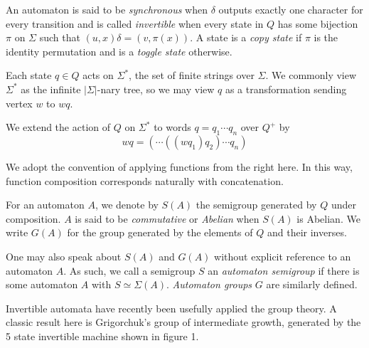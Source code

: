 \documentclass[10pt]{article} %
\newcommand{\defn}[1]{\textit{#1}}
\begin{document}
    An automaton is said to be \defn{synchronous} when $\delta$ outputs exactly one character for every transition and is called \defn{invertible} when every state in $Q$ has some bijection $\pi$ on $\Sigma$ such that $(u, x)\delta = (v, \pi(x))$. A state is a \defn{copy state} if $\pi$ is the identity permutation and is a \defn{toggle state} otherwise.

    Each state $q \in Q$ acts on $\Sigma^*$, the set of finite strings over $\Sigma$. We commonly view $\Sigma^*$ as the infinite $|\Sigma|$-nary tree, so we may view $q$ as a transformation sending vertex $w$ to $wq$.

    We extend the action of $Q$ on $\Sigma^*$ to words $q = q_1\cdots q_n$ over $Q^+$ by \[ wq = (\cdots((w q_1) q_2)\cdots q_n) \]

    We adopt the convention of applying functions from the right here. In this way, function composition corresponds naturally with concatenation.

    For an automaton $A$, we denote by $S(A)$ the semigroup generated by $Q$ under composition. $A$ is said to be \defn{commutative} or \defn{Abelian} when $S(A)$ is Abelian. We write $G(A)$ for the group generated by the elements of $Q$ and their inverses.

    One may also speak about $S(A)$ and $G(A)$ without explicit reference to an automaton $A$. As such, we call a semigroup $S$ an \defn{automaton semigroup} if there is some automaton $A$ with $S \simeq \Sigma(A)$. \defn{Automaton groups} $G$ are similarly defined.

    Invertible automata have recently been usefully applied the group theory. A classic result here is Grigorchuk's group of intermediate growth, generated by the 5 state invertible machine shown in figure 1.
    
\end{document}
